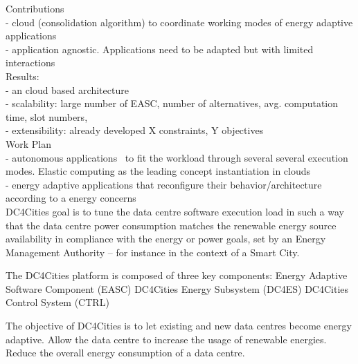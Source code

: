 Contributions \\
- cloud (consolidation algorithm) to coordinate working modes of energy adaptive applications \\
- application agnostic. Applications need to be adapted but with limited interactions \\
	
Results: \\
- an cloud based architecture \\
- scalability:  large number of EASC, number of alternatives, avg. computation time, slot numbers,  \\
- extensibility: already developed X constraints, Y objectives \\
 
Work Plan \\

- autonomous applications~\cite{kephart-computer2003} to fit the workload through several several execution modes. Elastic computing as the leading concept instantiation in clouds~\cite{x} \\
- energy adaptive applications that reconfigure their behavior/architecture  according to a energy concerns~\cite{energy-adaptive-apps-OSR12, others} \\


%
%
%

DC4Cities goal is to tune the data centre software execution load in such a way that the data centre power consumption matches the renewable energy source availability in compliance with the energy or power goals, set by an Energy Management Authority – for instance in the context of a Smart City.

The DC4Cities platform is composed of three key components:
Energy Adaptive Software Component (EASC)
DC4Cities Energy Subsystem (DC4ES) 
DC4Cities Control System (CTRL)

The objective of DC4Cities is to let existing and new data centres become energy adaptive. 
Allow the data centre to increase the usage of renewable energies.
Reduce the overall energy consumption of a data centre.

